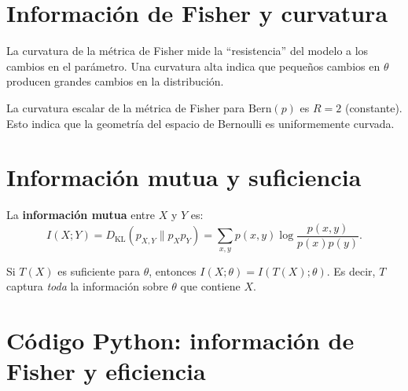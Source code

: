 \section{Información de Fisher y curvatura}

\begin{theorem}
	La curvatura de la métrica de Fisher mide la ``resistencia'' del modelo a los cambios en el parámetro.  Una curvatura alta indica que pequeños cambios en $\theta$ producen grandes cambios en la distribución.
\end{theorem}

\begin{example}
	La curvatura escalar de la métrica de Fisher para $\mathrm{Bern}(p)$ es $R = 2$ (constante).  Esto indica que la geometría del espacio de Bernoulli es uniformemente curvada.
\end{example}

\section{Información mutua y suficiencia}

\begin{definition}
	La \textbf{información mutua} entre $X$ y $Y$ es:
	\[
	I(X; Y) = D_{\mathrm{KL}}(p_{X,Y} \| p_X p_Y) = \sum_{x,y} p(x,y) \log \frac{p(x,y)}{p(x)p(y)}.
	\]
\end{definition}

\begin{theorem}
	Si $T(X)$ es suficiente para $\theta$, entonces $I(X; \theta) = I(T(X); \theta)$.  Es decir, $T$ captura \emph{toda} la información sobre $\theta$ que contiene $X$.
\end{theorem}

\section{Código Python: información de Fisher y eficiencia}

